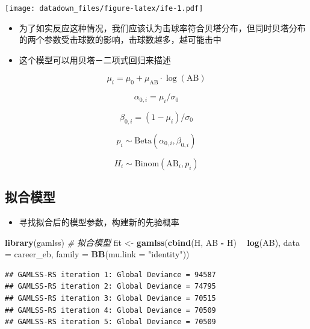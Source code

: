 \documentclass[]{book}
\newenvironment{Shaded}{\begin{snugshade}}{\end{snugshade}}
\newcommand{\CommentTok}[1]{\textcolor[rgb]{0.56,0.35,0.01}{\textit{#1}}}
\newcommand{\DataTypeTok}[1]{\textcolor[rgb]{0.13,0.29,0.53}{#1}}
\newcommand{\KeywordTok}[1]{\textcolor[rgb]{0.13,0.29,0.53}{\textbf{#1}}}
\newcommand{\NormalTok}[1]{#1}
\newcommand{\OperatorTok}[1]{\textcolor[rgb]{0.81,0.36,0.00}{\textbf{#1}}}
\newcommand{\StringTok}[1]{\textcolor[rgb]{0.31,0.60,0.02}{#1}}
\providecommand{\tightlist}{%
  \setlength{\itemsep}{0pt}\setlength{\parskip}{0pt}}
\begin{document}
\texttt{[image: datadown\_files/figure-latex/ife-1.pdf]}

\begin{itemize}
\item
  为了如实反应这种情况，我们应该认为击球率符合贝塔分布，但同时贝塔分布的两个参数受击球数的影响，击球数越多，越可能击中
\item
  这个模型可以用贝塔－二项式回归来描述
\end{itemize}

\[\mu_i = \mu_0 + \mu_{\mbox{AB}} \cdot \log(\mbox{AB})\]

\[\alpha_{0,i} = \mu_i / \sigma_0\]

\[\beta_{0,i} = (1 - \mu_i) / \sigma_0\]

\[p_i \sim \mbox{Beta}(\alpha_{0,i}, \beta_{0,i})\]

\[H_i \sim \mbox{Binom}(\mbox{AB}_i, p_i)\]

\hypertarget{ux62dfux5408ux6a21ux578b}{%
\subsection{拟合模型}\label{ux62dfux5408ux6a21ux578b}}

\begin{itemize}
\tightlist
\item
  寻找拟合后的模型参数，构建新的先验概率
\end{itemize}

\begin{Shaded}
\begin{Highlighting}[]
\KeywordTok{library}\NormalTok{(gamlss)}
\CommentTok{# 拟合模型}
\NormalTok{fit <-}\StringTok{ }\KeywordTok{gamlss}\NormalTok{(}\KeywordTok{cbind}\NormalTok{(H, AB }\OperatorTok{-}\StringTok{ }\NormalTok{H) }\OperatorTok{~}\StringTok{ }\KeywordTok{log}\NormalTok{(AB),}
              \DataTypeTok{data =}\NormalTok{ career_eb,}
              \DataTypeTok{family =} \KeywordTok{BB}\NormalTok{(}\DataTypeTok{mu.link =} \StringTok{"identity"}\NormalTok{))}
\end{Highlighting}
\end{Shaded}

\begin{verbatim}
## GAMLSS-RS iteration 1: Global Deviance = 94587 
## GAMLSS-RS iteration 2: Global Deviance = 74795 
## GAMLSS-RS iteration 3: Global Deviance = 70515 
## GAMLSS-RS iteration 4: Global Deviance = 70509 
## GAMLSS-RS iteration 5: Global Deviance = 70509
\end{verbatim}
\end{document}
